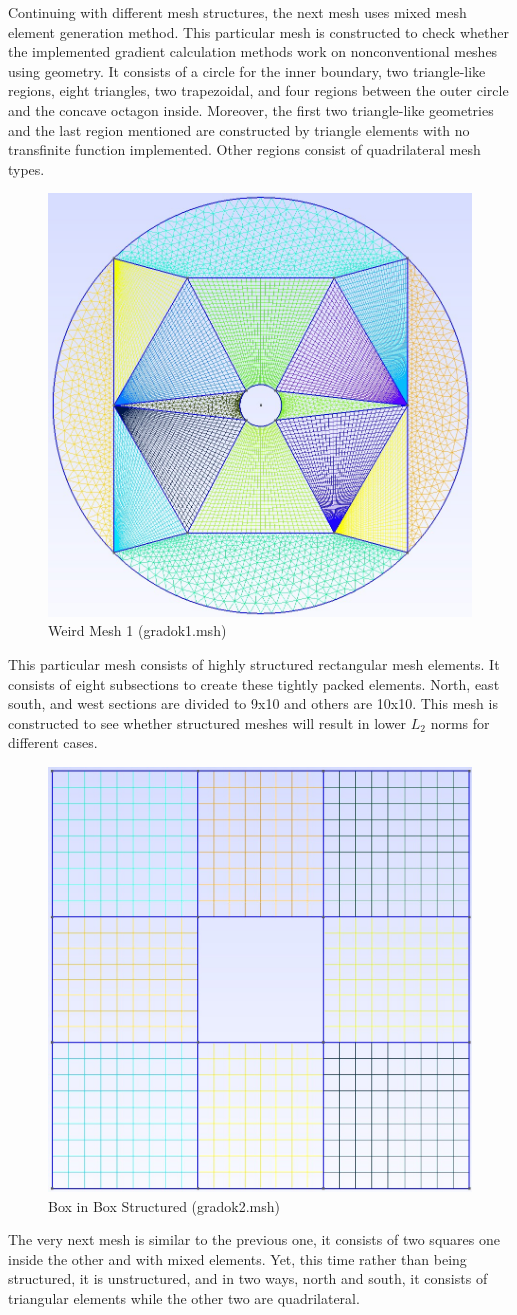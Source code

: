 \documentclass[a4paper, 12pt]{article}
\begin{document}
 Continuing with different mesh structures, the next mesh uses mixed mesh element generation method. This particular mesh is constructed to check whether the implemented gradient calculation methods work on nonconventional meshes using geometry. It consists of a circle for the inner boundary, two triangle-like regions, eight triangles, two trapezoidal, and four regions between the outer circle and the concave octagon inside. Moreover, the first two triangle-like geometries and the last region mentioned are constructed by triangle elements with no transfinite function implemented. Other regions consist of quadrilateral mesh types. \\\par
\par
\begin{figure}[H]
    \centering
    \includegraphics[width=0.3\linewidth]{onurk1.jpg}
    \caption{Weird Mesh 1 (gradok1.msh)}
\end{figure}
This particular mesh consists of highly structured rectangular mesh elements. It consists of eight subsections to create these tightly packed elements. North, east south, and west sections are divided to 9x10 and others are 10x10. This mesh is constructed to see whether structured meshes will result in lower $L_2$ norms for different cases. \\\par
\label{f4}
\begin{figure}[H]
    \centering
    \includegraphics[width=0.3\linewidth]{onurk2.jpg}
    \caption{Box in Box Structured (gradok2.msh)}
\end{figure}
The very next mesh is similar to the previous one, it consists of two squares one inside the other and with mixed elements. Yet, this time rather than being structured, it is unstructured, and in two ways, north and south, it consists of triangular elements while the other two are quadrilateral.  \par
\end{document}
